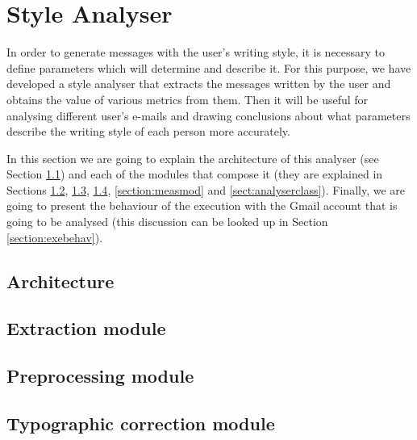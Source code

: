\chapter{Style Analyser}
\label{cap:analyser}


In order to generate messages with the user's writing style, it is necessary to define parameters which will determine and describe it. For this purpose, we have developed a style analyser that extracts the messages written by the user and obtains the value of various metrics from them. Then it will be useful for analysing different user's e-mails and drawing conclusions about what parameters describe the writing style of each person more accurately.

In this section we are going to explain the architecture of this analyser (see Section \ref{section:stylearch}) and each of the modules that compose it (they are explained in Sections \ref{section:extmod}, \ref{section:prepmod}, \ref{section:typomod}, \ref{section:measmod} and \ref{sect:analyserclass}). Finally, we are going to present the behaviour of the execution with the Gmail account that is going to be analysed (this discussion can be looked up in Section \ref{section:exebehav}).

\section{Architecture} \label{section:stylearch}


\section{Extraction module} \label{section:extmod}


\section{Preprocessing module} \label{section:prepmod}


\section{Typographic correction module} \label{section:typomod}


